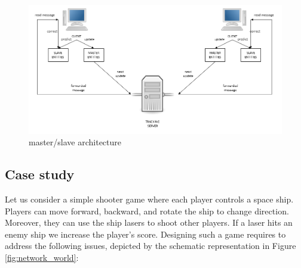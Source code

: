 \begin{figure}
	\centering
	\includegraphics[scale = 0.3]{Figures/masterslave}
	\caption{master/slave architecture}
	\label{fig:masterslave}
\end{figure}

\subsection{Case study}
Let us consider a simple shooter game where each player controls a space ship. Players can move forward, backward, and rotate the ship to change direction. Moreover, they can use the ship lasers to shoot other players. If a laser hits an enemy ship we increase the player's score. Designing such a game requires to address the following issues, depicted by the schematic representation in Figure \ref{fig:network_world}:

